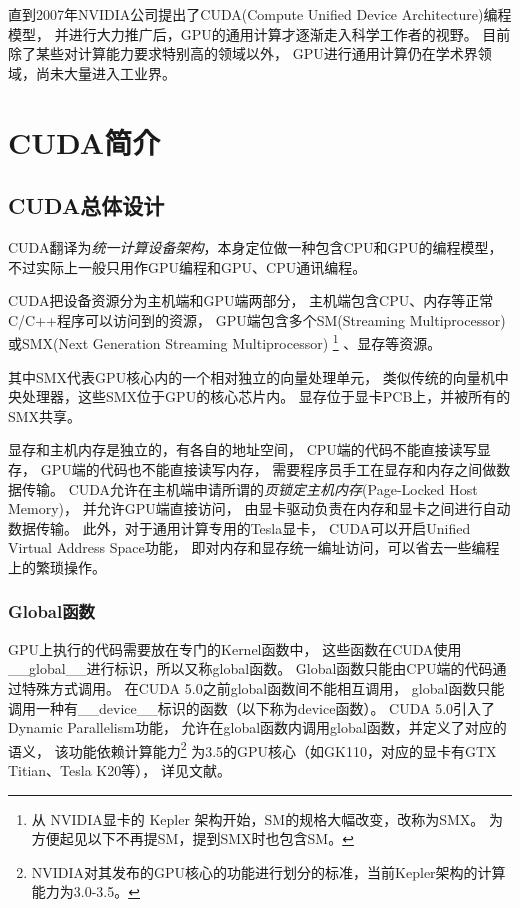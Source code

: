 直到2007年NVIDIA公司提出了CUDA(Compute Unified Device Architecture)编程模型，
并进行大力推广后，GPU的通用计算才逐渐走入科学工作者的视野。
目前除了某些对计算能力要求特别高的领域以外，
GPU进行通用计算仍在学术界领域，尚未大量进入工业界。

\section{CUDA简介}

\subsection{CUDA总体设计}

CUDA翻译为\emph{统一计算设备架构}，本身定位做一种包含CPU和GPU的编程模型，
不过实际上一般只用作GPU编程和GPU、CPU通讯编程。

CUDA把设备资源分为主机端和GPU端两部分，
主机端包含CPU、内存等正常C/C++程序可以访问到的资源，
GPU端包含多个SM(Streaming Multiprocessor)
或SMX(Next Generation Streaming Multiprocessor)
\footnote{从 NVIDIA显卡的 Kepler 架构开始，SM的规格大幅改变，改称为SMX。
为方便起见以下不再提SM，提到SMX时也包含SM。}
、显存等资源。

其中SMX代表GPU核心内的一个相对独立的向量处理单元，
类似传统的向量机中央处理器，这些SMX位于GPU的核心芯片内。
显存位于显卡PCB上，并被所有的SMX共享。

显存和主机内存是独立的，有各自的地址空间，
CPU端的代码不能直接读写显存，
GPU端的代码也不能直接读写内存，
需要程序员手工在显存和内存之间做数据传输。
CUDA允许在主机端申请所谓的\emph{页锁定主机内存}(Page-Locked Host Memory)，
并允许GPU端直接访问，
由显卡驱动负责在内存和显卡之间进行自动数据传输。
此外，对于通用计算专用的Tesla显卡，
CUDA可以开启Unified Virtual Address Space功能，
即对内存和显存统一编址访问，可以省去一些编程上的繁琐操作。
\cite{cudadoc-cprogrammingguide}

\subsubsection{Global函数}

GPU上执行的代码需要放在专门的Kernel函数中，
这些函数在CUDA使用\_\_global\_\_进行标识，所以又称global函数。
Global函数只能由CPU端的代码通过特殊方式调用。
在CUDA 5.0之前global函数间不能相互调用，
global函数只能调用一种有\_\_device\_\_标识的函数（以下称为device函数）。
CUDA 5.0引入了Dynamic Parallelism功能，
允许在global函数内调用global函数，并定义了对应的语义，
该功能依赖计算能力\footnote{NVIDIA对其发布的GPU核心的功能进行划分的标准，当前Kepler架构的计算能力为3.0-3.5。}%
为3.5的GPU核心（如GK110，对应的显卡有GTX Titian、Tesla K20等），
详见文献。


